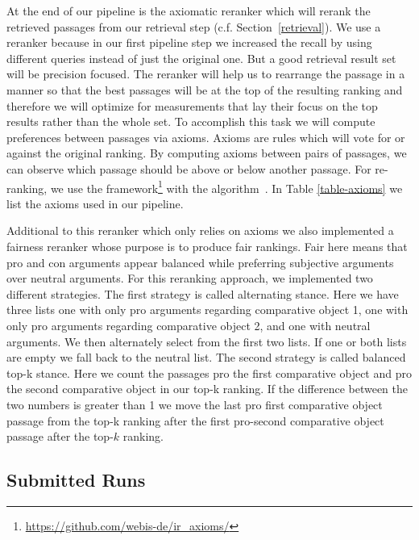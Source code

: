 At the end of our pipeline is the axiomatic reranker which will rerank the retrieved passages from our retrieval step (c.f. Section~\ref{retrieval}).
We use a reranker because in our first pipeline step we increased the recall by using different queries instead of just the original one.
But a good retrieval result set will be precision focused.
The reranker will help us to rearrange the passage in a manner so that the best passages will be at the top of the resulting ranking and therefore we will optimize for measurements that lay their focus on the top results rather than the whole set.
To accomplish this task we will compute preferences between passages via axioms.
Axioms are rules which will vote for or against the original ranking.
By computing axioms between pairs of passages, we can observe which passage should be above or below another passage.
For re-ranking, we use the \iraxioms framework\footnote{\url{https://github.com/webis-de/ir_axioms/}} with the \KwikSort algorithm~\cite{HagenVGS2016}.
In Table \ref{table-axioms} we list the axioms used in our pipeline.

Additional to this reranker which only relies on axioms we also implemented a fairness reranker whose purpose is to produce fair rankings. Fair here means that pro and con arguments appear balanced while preferring subjective arguments over neutral arguments. For this reranking approach, we implemented two different strategies. The first strategy is called alternating stance. Here we have three lists one with only pro arguments regarding comparative object 1, one with only pro arguments regarding comparative object 2, and one with neutral arguments. We then alternately select from the first two lists. If one or both lists are empty we fall back to the neutral list. The second strategy is called balanced top-k stance. Here we count the passages pro the first comparative object and pro the second comparative object in our top-k ranking. If the difference between the two numbers is greater than 1 we move the last pro first comparative object passage from the top-k ranking after the first pro-second comparative object passage after the top-\(k\) ranking.

\subsection{Submitted Runs}

